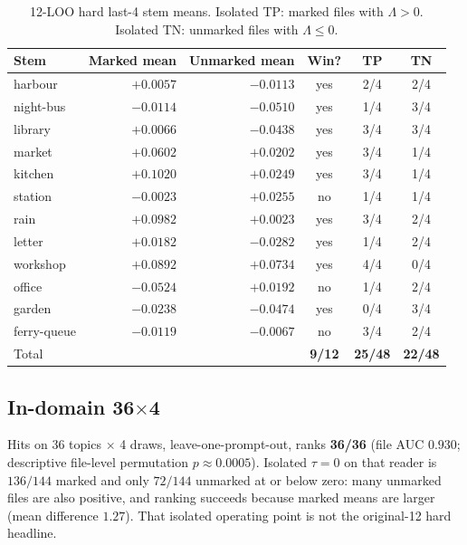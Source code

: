 \documentclass[11pt,a4paper]{article}
\theoremstyle{definition}
\newcommand{\LLR}{\Lambda}
\begin{document}
\begin{table}[t]
\centering
\small
\caption{12-LOO hard last-4 stem means. Isolated TP: marked files with
$\LLR>0$. Isolated TN: unmarked files with $\LLR\le 0$.}
\label{tab:stems}
\begin{tabular}{l r r c c c}
\toprule
Stem & Marked mean & Unmarked mean & Win? & TP & TN \\
\midrule
harbour       & $+0.0057$ & $-0.0113$ & yes & 2/4 & 2/4 \\
night-bus     & $-0.0114$ & $-0.0510$ & yes & 1/4 & 3/4 \\
library       & $+0.0066$ & $-0.0438$ & yes & 3/4 & 3/4 \\
market        & $+0.0602$ & $+0.0202$ & yes & 3/4 & 1/4 \\
kitchen       & $+0.1020$ & $+0.0249$ & yes & 3/4 & 1/4 \\
station       & $-0.0023$ & $+0.0255$ & no  & 1/4 & 1/4 \\
rain          & $+0.0982$ & $+0.0023$ & yes & 3/4 & 2/4 \\
letter        & $+0.0182$ & $-0.0282$ & yes & 1/4 & 2/4 \\
workshop      & $+0.0892$ & $+0.0734$ & yes & 4/4 & 0/4 \\
office        & $-0.0524$ & $+0.0192$ & no  & 1/4 & 2/4 \\
garden        & $-0.0238$ & $-0.0474$ & yes & 0/4 & 3/4 \\
ferry-queue   & $-0.0119$ & $-0.0067$ & no  & 3/4 & 2/4 \\
\midrule
Total
  &  &  & \textbf{9/12} & \textbf{25/48} & \textbf{22/48} \\
\bottomrule
\end{tabular}
\end{table}

\subsection{\texorpdfstring{In-domain 36$\times$4}{In-domain 36x4}}

Hits on 36 topics $\times$ 4 draws, leave-one-prompt-out, ranks
\textbf{36/36} (file AUC $0.930$; descriptive file-level permutation
$p\approx 0.0005$). Isolated $\tau=0$ on that reader is $136/144$
marked and only $72/144$ unmarked at or below zero: many unmarked files
are also positive, and ranking succeeds because marked means are larger
(mean difference $1.27$). That isolated operating point is not the
original-12 hard headline.
\end{document}
